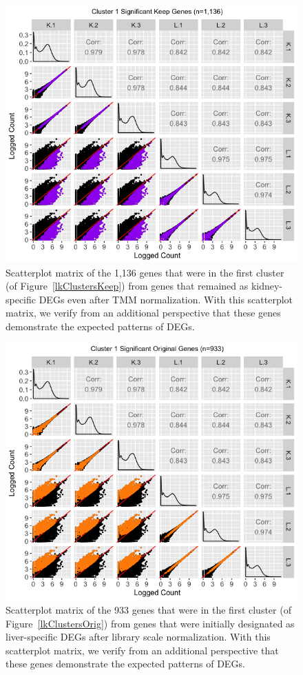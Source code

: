\documentclass{article}
\begin{document}
\null
\begin{figure}[t!]
\centerline{\includegraphics[width=1\columnwidth]{../MakeFigures/lkClustersKeepSM.jpg}}
\caption{Scatterplot matrix of the 1,136 genes that were in the first cluster (of Figure~\ref{lkClustersKeep}) from genes that remained as kidney-specific DEGs even after TMM normalization. With this scatterplot matrix, we verify from an additional perspective that these genes demonstrate the expected patterns of DEGs.
\label{lkClustersKeepSM}}
\end{figure}

\null
\begin{figure}[t!]
\centerline{\includegraphics[width=1\columnwidth]{../MakeFigures/lkClustersOrigSM.jpg}}
\caption{Scatterplot matrix of the 933 genes that were in the first cluster (of Figure~\ref{lkClustersOrig}) from genes that were initially designated as liver-specific DEGs after library scale normalization. With this scatterplot matrix, we verify from an additional perspective that these genes demonstrate the expected patterns of DEGs.
\label{lkClustersOrigSM}}
\end{figure}
\end{document}
